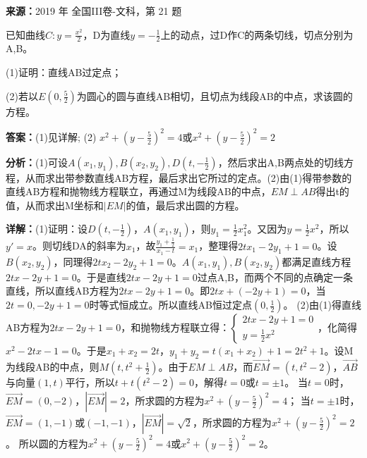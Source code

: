 \begin{question}[points=12]
\textbf{来源：}2019 年 全国III卷-文科，第 21 题\par
已知曲线$C:y=\frac{x^2}{2}$，D为直线$y=-\frac{1}{2}$上的动点，过D作C的两条切线，切点分别为A,B。

(1)证明：直线AB过定点；

(2)若以$E(0,\frac{5}{2})$为圆心的圆与直线AB相切，且切点为线段AB的中点，求该圆的方程。
\begin{solution}
\textbf{答案：}(1)见详解; (2) $x^2+(y-\frac{5}{2})^2=4$或$x^2+(y-\frac{5}{2})^2=2$

\textbf{分析：}(1)可设$A(x_1,y_1),B(x_2,y_2),D(t,-\frac{1}{2})$，然后求出A,B两点处的切线方程，从而求出带参数直线AB方程，最后求出它所过的定点。(2)由(1)得带参数的直线AB方程和抛物线方程联立，再通过M为线段AB的中点，$EM\perp AB$得出t的值，从而求出M坐标和$|EM|$的值，最后求出圆的方程。

\textbf{详解：}(1)证明：设$D(t,-\frac{1}{2})$，$A(x_1,y_1)$，则$y_1=\frac{1}{2}x_1^2$。又因为$y=\frac{1}{2}x^2$，所以$y'=x$。则切线DA的斜率为$x_1$，故$\frac{y_1+\frac{1}{2}}{x_1-t}=x_1$，整理得$2tx_1-2y_1+1=0$。设$B(x_2,y_2)$，同理得$2tx_2-2y_2+1=0$。$A(x_1,y_1),B(x_2,y_2)$都满足直线方程$2tx-2y+1=0$。于是直线$2tx-2y+1=0$过点A,B，而两个不同的点确定一条直线，所以直线AB方程为$2tx-2y+1=0$。即$2tx+(-2y+1)=0$，当$2t=0,-2y+1=0$时等式恒成立。所以直线AB恒过定点$(0,\frac{1}{2})$。
(2)由(1)得直线AB方程为$2tx-2y+1=0$，和抛物线方程联立得：$\begin{cases} 2tx-2y+1=0 \\ y=\frac{1}{2}x^2 \end{cases}$，化简得$x^2-2tx-1=0$。于是$x_1+x_2=2t$，$y_1+y_2=t(x_1+x_2)+1=2t^2+1$。设M为线段AB的中点，则$M(t,t^2+\frac{1}{2})$。由于$EM\perp AB$，而$\overrightarrow{EM}=(t,t^2-2)$，$\overrightarrow{AB}$与向量$(1,t)$平行，所以$t+t(t^2-2)=0$，解得$t=0$或$t=\pm1$。
当$t=0$时，$\overrightarrow{EM}=(0,-2)$，$|\overrightarrow{EM}|=2$，所求圆的方程为$x^2+(y-\frac{5}{2})^2=4$；
当$t=\pm1$时，$\overrightarrow{EM}=(1,-1)$或$(-1,-1)$，$|\overrightarrow{EM}|=\sqrt{2}$，所求圆的方程为$x^2+(y-\frac{5}{2})^2=2$。
所以圆的方程为$x^2+(y-\frac{5}{2})^2=4$或$x^2+(y-\frac{5}{2})^2=2$。
\end{solution}
\end{question}

